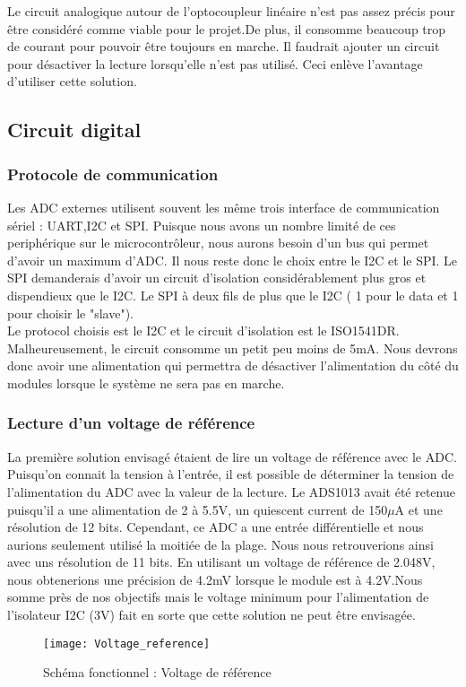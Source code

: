 				Le circuit analogique autour de l'optocoupleur lin\'{e}aire n'est pas assez pr\'{e}cis pour \^{e}tre consid\'{e}r\'{e} comme viable pour le projet.De plus, il consomme beaucoup trop de courant pour pouvoir \^{e}tre toujours en marche. Il faudrait ajouter un circuit pour d\'{e}sactiver la lecture lorsqu'elle n'est pas utilis\'{e}. Ceci enl\`{e}ve l'avantage d'utiliser cette solution. 
				\newpage
				
			\subsection{Circuit digital}
				\subsubsection{Protocole de communication}
					Les ADC externes utilisent souvent les m\^{e}me trois interface de communication s\'{e}riel : UART,I2C et SPI. Puisque nous avons un nombre limit\'{e} de ces periph\'{e}rique sur le microcontr\^{o}leur, nous aurons besoin d'un bus qui permet d'avoir un maximum d'ADC. Il nous reste donc le choix entre le I2C et le SPI. Le SPI demanderais d'avoir un circuit d'isolation consid\'{e}rablement plus gros et dispendieux que le I2C. Le SPI \`{a} deux fils de plus que le I2C ( 1 pour le data et 1 pour choisir le "slave"). \\
					Le protocol choisis est le I2C et le circuit d'isolation est le ISO1541DR. Malheureusement, le circuit consomme un petit peu moins de 5mA. Nous devrons donc avoir une alimentation qui permettra de d\'{e}sactiver l'alimentation du c\^{o}t\'{e} du modules lorsque le syst\`{e}me ne sera pas en marche.
					
				\subsubsection{Lecture d'un voltage de r\'{e}f\'{e}rence}
					La premi\`{e}re solution envisag\'{e} \'{e}taient de lire un voltage de r\'{e}f\'{e}rence avec le ADC. Puisqu'on connait la tension \`{a} l'entr\'{e}e, il est possible de d\'{e}terminer la tension de l'alimentation du ADC avec la valeur de la lecture. Le ADS1013 avait \'{e}t\'{e} retenue puisqu'il a une alimentation de 2 \`{a} 5.5V, un quiescent current de 150$\mu$A et une r\'{e}solution de 12 bits. Cependant, ce ADC a une entr\'{e}e diff\'{e}rentielle et nous aurions seulement utilis\'{e} la moiti\'{e}e de la plage. Nous nous retrouverions ainsi avec uns r\'{e}solution de 11 bits. En utilisant un voltage de r\'{e}f\'{e}rence de 2.048V, nous obtenerions une pr\'{e}cision de 4.2mV lorsque le module est \`{a} 4.2V.Nous somme pr\`{e}s de nos objectifs mais le voltage minimum pour l'alimentation de l'isolateur I2C (3V) fait en sorte que cette solution ne peut \^{e}tre envisag\'{e}e.
					\begin{figure}[h]
						\centering
						\texttt{[image: Voltage\_reference]} \\ \vspace{0cm}
						\caption{Sch\'{e}ma fonctionnel : Voltage de r\'{e}f\'{e}rence }
						\label{Fig:schema_voltage_ref}
					\end{figure}

